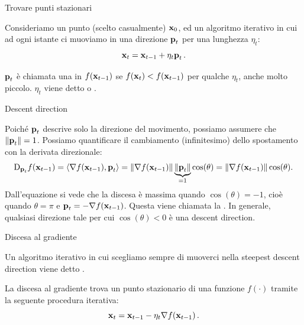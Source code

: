 \documentclass[12pt,aspectratio=169]{beamer}
\begin{document}
\begin{frame}{Trovare punti stazionari}
	
	Consideriamo un punto (scelto casualmente) $\boldsymbol{\mathbf{x}}_0$, ed un algoritmo iterativo in cui ad ogni istante ci muoviamo in una direzione $\boldsymbol{\mathbf{p}}_t$ per una lunghezza $\eta_t$:
	\begin{equation}
		\boldsymbol{\mathbf{x}}_t = \boldsymbol{\mathbf{x}}_{t-1} + \eta_t \boldsymbol{\mathbf{p}}_t \,.
	\end{equation}
	\begin{tcolorbox}
		$\boldsymbol{\mathbf{p}}_t$ è chiamata una  in $f(\boldsymbol{\mathbf{x}}_{t-1})$ se $f(\boldsymbol{\mathbf{x}}_t) < f(\boldsymbol{\mathbf{x}}_{t-1})$ per qualche $\eta_t$, anche molto piccolo. $\eta_t$ viene detto  o .
	\end{tcolorbox}
	
\end{frame}

\begin{frame}{Descent direction}
	
	Poiché $\boldsymbol{\mathbf{p}}_t$ descrive solo la direzione del movimento, possiamo assumere che $\lVert \boldsymbol{\mathbf{p}}_t \rVert = 1$. Possiamo quantificare il cambiamento (infinitesimo) dello spostamento con la derivata direzionale:
	\begin{equation*}
		\mathrm{D}_{\boldsymbol{\mathbf{p}}_t} f(\boldsymbol{\mathbf{x}}_{t-1}) = \langle \nabla f(\boldsymbol{\mathbf{x}}_{t-1}), \boldsymbol{\mathbf{p}}_t \rangle = \lVert \nabla f(\boldsymbol{\mathbf{x}}_{t-1}) \rVert \underbrace{\lVert \boldsymbol{\mathbf{p}}_t \rVert}_{=1} \cos(\theta) = \lVert \nabla f(\boldsymbol{\mathbf{x}}_{t-1}) \rVert \cos(\theta).
	\end{equation*}
	Dall'equazione si vede che la discesa è massima quando $\cos(\theta) = -1$, cioè quando $\theta=\pi$ e $\boldsymbol{\mathbf{p}}_t = - \nabla f(\boldsymbol{\mathbf{x}}_{t-1})$. Questa viene chiamata la . In generale, qualsiasi direzione tale per cui $\cos(\theta) < 0$ è una descent direction.
	
\end{frame}

\begin{frame}{Discesa al gradiente}
	
	Un algoritmo iterativo in cui scegliamo sempre di muoverci nella steepest descent direction viene detto \myalert{discesa al gradiente}.
	\begin{tcolorbox}
		La discesa al gradiente trova un punto stazionario di una funzione $f(\cdot)$ tramite la seguente procedura iterativa:
		\begin{equation}
		\boldsymbol{\mathbf{x}}_t = \boldsymbol{\mathbf{x}}_{t-1} - \eta_t \nabla f(\boldsymbol{\mathbf{x}}_{t-1}) \,.
	\end{equation}
	\end{tcolorbox}
	
\end{frame}
\end{document}
